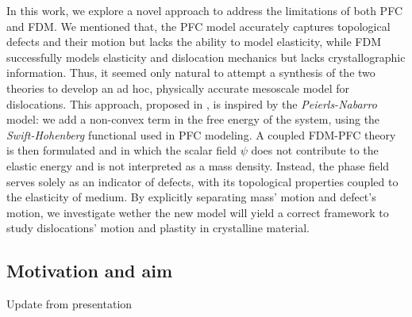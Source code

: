 \documentclass[11pt]{article}
\begin{document}
In this work, we explore a novel approach to address the limitations of both PFC and FDM. We mentioned that, the PFC model accurately captures topological defects and their motion but lacks the ability to model elasticity, while FDM successfully models elasticity and dislocation mechanics but lacks crystallographic information. Thus, it seemed only natural to attempt a synthesis of the two theories to develop an ad hoc, physically accurate mesoscale model for dislocations. This approach, proposed in \parencite{acharyaFielddislocation2020}, is inspired by the \emph{Peierls-Nabarro} model: we add a non-convex term in the free energy of the system, using the \emph{Swift-Hohenberg} functional used in PFC modeling. A coupled FDM-PFC theory is then formulated and in which the scalar field $\psi$ does not contribute to the elastic energy and is not interpreted as a mass density. Instead, the phase field serves solely as an indicator of defects, with its topological properties coupled to the elasticity of medium. By explicitly separating mass' motion and defect's motion, we investigate wether the new model will yield a correct framework to study dislocations' motion and plastity in crystalline material.\\

\subsection{Motivation and aim}
Update from presentation
\end{document}
